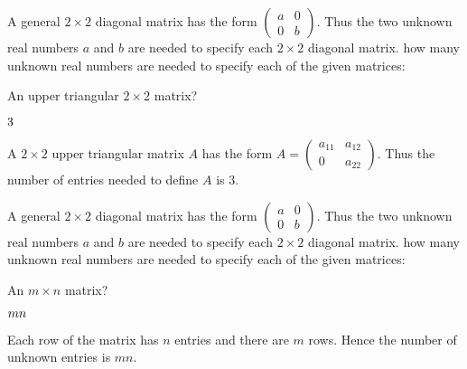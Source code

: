 \documentclass{ximera}
\def\mattwo#1#2#3#4{\left(\begin{array}{rr} #1 & #2 \\ #3 & #4\end{array}\right)}
\begin{document}
\problemlabel

\noindent A general $2\times 2$ diagonal matrix has the form $\mattwo{a}{0}{0}{b}$.  Thus the two unknown real numbers $a$ and $b$ are needed to specify each $2\times 2$ diagonal matrix.  how many unknown real numbers are needed to specify each of the given matrices:

\begin{exercise}  \label{c1.3.1a}
An upper triangular $2\times 2$ matrix? \begin{prompt}$3$\end{prompt}

\begin{solution}
A $2\times 2$ upper triangular matrix $A$ has the form $A = \left( \begin{array}{cc}
            a_{11} & a_{12} \\
            0 & a_{22} \end{array} \right)$.  Thus the number of entries needed to define $A$ is $3$.  

\end{solution}
\end{exercise}





\problemlabel

\noindent A general $2\times 2$ diagonal matrix has the form $\mattwo{a}{0}{0}{b}$.  Thus the two unknown real numbers $a$ and $b$ are needed to specify each $2\times 2$ diagonal matrix.  how many unknown real numbers are needed to specify each of the given matrices:

\begin{exercise}  \label{c1.3.2}
An $m\times n$ matrix? \begin{prompt}$mn$\end{prompt}

\begin{solution}
Each row of the matrix has $n$ entries and there are $m$ rows.  Hence the number of unknown entries is $mn$.

\end{solution}
\end{exercise}





\problemlabel
\end{document}
